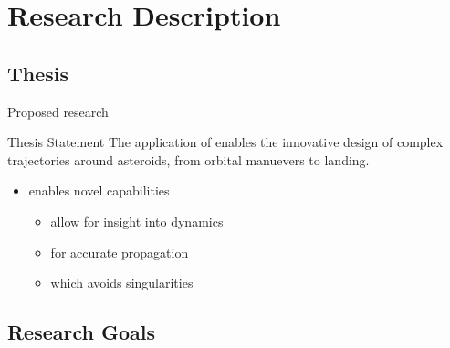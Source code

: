 
\section*{Research Description}
\subsection*{Thesis}

\begin{frame}[t]{Proposed research}
    \begin{block}{Thesis Statement}
        The application of  enables the innovative design of complex trajectories around asteroids, from orbital manuevers to landing.
    \end{block}
    \pause
    \begin{itemize}
        \item {} enables novel capabilities
        \begin{itemize}     
            \item {} allow for insight into dynamics
            \item {} for accurate propagation
            \item {} which avoids singularities
        \end{itemize}
    \end{itemize}

\end{frame}

\subsection*{Research Goals}

